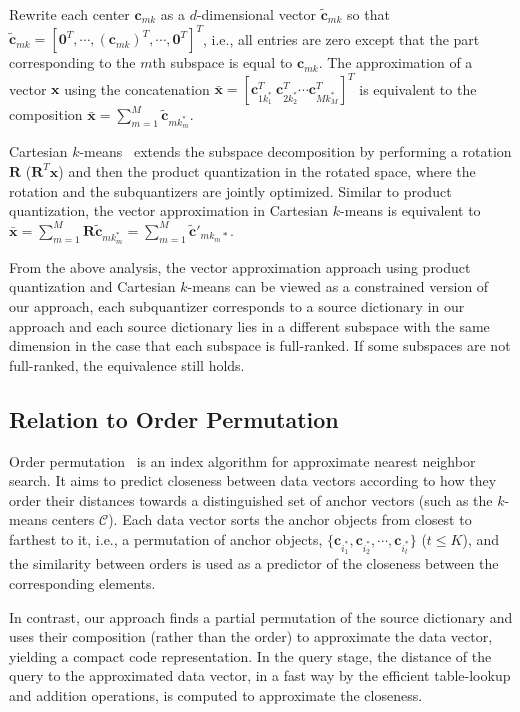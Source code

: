 \documentclass[10pt, letterpaper]{article}
\begin{document}
Rewrite each center $\mathbf{c}_{mk}$
as a $d$-dimensional vector $\tilde{\mathbf{c}}_{mk}$
so that
$\tilde{\mathbf{c}}_{mk} = [\boldsymbol{0}^T, \cdots, (\mathbf{c}_{mk})^T, \cdots, \boldsymbol{0}^T]^T$,
i.e., all entries are zero
except that the part corresponding to the $m$th subspace
is equal to $\mathbf{c}_{mk}$.
The approximation of a vector $\mathbf{x}$
using the concatenation
$\bar{\mathbf{x}} = [\mathbf{c}_{1k_1^*}^T~\mathbf{c}_{2k_2^*}^T \cdots \mathbf{c}_{Mk_M^*}^T]^T$
is equivalent to
the composition
$\bar{\mathbf{x}} = \sum_{m=1}^M \tilde{\mathbf{c}}_{mk_m^*}$.

Cartesian $k$-means~\cite{NorouziF13} extends the subspace decomposition
by performing a rotation $\mathbf{R}$
($\mathbf{R}^T\mathbf{x}$)
and then the product quantization
in the rotated space,
where the rotation and the subquantizers
are jointly optimized.
Similar to product quantization,
the vector approximation in Cartesian $k$-means
is equivalent to
$\bar{\mathbf{x}} = \sum_{m=1}^M \mathbf{R} \tilde{\mathbf{c}}_{mk_m^*}
= \sum_{m=1}^M \tilde{\mathbf{c}}'_{mk_m*}$.

From the above analysis,
the vector approximation approach using product quantization
and Cartesian $k$-means
can be viewed as a constrained version
of our approach,
each subquantizer corresponds to
a source dictionary in our approach
and each source dictionary lies in a different subspace
with the same dimension
in the case that each subspace is full-ranked.
If some subspaces are not full-ranked,
the equivalence still holds.


\subsection{Relation to Order Permutation}
Order permutation~\cite{ChavezFN08}
is an index algorithm
for approximate nearest neighbor search.
It aims to predict closeness
between data vectors according to how they order their distances
towards a distinguished set of anchor vectors
(such as the $k$-means centers $\mathcal{C}$).
Each data vector sorts the anchor objects from
closest to farthest to it,
i.e., a permutation of anchor objects,
$\{\mathbf{c}_{i_1^*}, \mathbf{c}_{i_2^*}, \cdots, \mathbf{c}_{i_t^*}\}$
($t \leqslant K$),
and the similarity between orders
is used as a predictor of the
closeness between the corresponding elements.

In contrast,
our approach finds a partial permutation of
the source dictionary
and uses their composition (rather than the order) to approximate
the data vector,
yielding a compact code representation.
In the query stage,
the distance of the query to the approximated data vector,
in a fast way by the efficient
table-lookup and addition operations,
is computed
to approximate the closeness.
\end{document}
